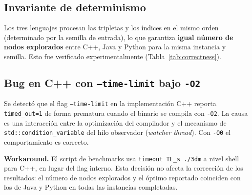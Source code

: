 \begin{algorithm}[htbp]
\DontPrintSemicolon
\caption{SMART: backtracking con MRV + bitmask + poda}
\label{alg:smart}
\end{algorithm}

\subsection{Invariante de determinismo}
\label{sec:impl:determinismo}

Los tres lenguajes procesan las tripletas y los índices en el mismo orden
(determinado por la semilla de entrada), lo que garantiza \textbf{igual número
de nodos explorados} entre C++, Java y Python para la misma instancia y semilla.
Esto fue verificado experimentalmente (Tabla~\ref{tab:correctness}).

\subsection{Bug en C++ con \texttt{--time-limit} bajo \texttt{-O2}}
\label{sec:impl:bug}

Se detectó que el flag \texttt{--time-limit} en la implementación C++ reporta
\texttt{timed\_out=1} de forma prematura cuando el binario se compila con
\texttt{-O2}.  La causa es una interacción entre la optimización del compilador
y el mecanismo de \texttt{std::condition\_variable} del hilo observador
(\textit{watcher thread}).  Con \texttt{-O0} el comportamiento es correcto.

\textbf{Workaround.}  El script de benchmarks usa \texttt{timeout TL\_s ./3dm}
a nivel shell para C++, en lugar del flag interno.  Esta decisión no afecta
la corrección de los resultados: el número de nodos explorados y el óptimo
reportado coinciden con los de Java y Python en todas las instancias
completadas.

